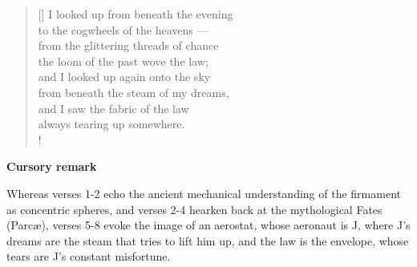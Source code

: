 \documentclass[a4paper,12pt,twoside,final]{book}
\begin{document}
\newpage


\settowidth{\versewidth}{from under the steam of my dreams,}

\begin{verse}[\versewidth]
  I looked up from beneath the evening \\
  to the cogwheels of the heavens --- \\
  from the glittering threads of chance \\
  the loom of the past wove the law; \\
  and I looked up again onto the sky \\
  from beneath the steam of my dreams, \\
  and I saw the fabric of the law \\
  always tearing up somewhere. \\!
\end{verse}


\bigskip

\noindent \textbf{Cursory remark}

\medskip

Whereas verses 1-2 echo the ancient mechanical understanding of the
firmament as concentric spheres, and verses 2-4 hearken back at the
mythological Fates (Parc\ae), verses 5-8 evoke the image of an
aerostat, whose aeronaut is J, where J's dreams are the steam that
tries to lift him up, and the law is the envelope, whose tears are J's
constant misfortune.

\newpage

\settowidth{\versewidth}{törvényt szőtt a mult szövőszéke}
\end{document}
